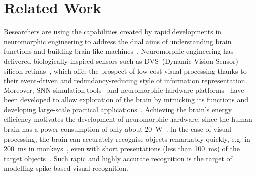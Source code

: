 \section{Related Work}
\label{sec:chapt6_relate}
Researchers are using the capabilities created by rapid developments in neuromorphic engineering to address the dual aims of understanding brain functions and building brain-like machines~\citep{furber2007neural}.
Neuromorphic engineering has delivered biologically-inspired sensors such as DVS~(Dynamic Vision Sensor) silicon retinas~\citep{serrano2013128, delbruck2008frame, yang2015dynamic, posch2014retinomorphic}, which offer the prospect of low-cost visual processing thanks to their event-driven and redundancy-reducing style of information representation.
Moreover, SNN simulation tools~\citep{davison2008pynn, gewaltig2007nest, goodman2008brian} and neuromorphic hardware platforms~\citep{furber2014spinnaker,  schemmel2010wafer,benjamin2014neurogrid,merolla2014million} have been developed to allow exploration of the brain by mimicking its functions and developing large-scale practical applications~\citep{eliasmith2012large}.
Achieving the brain's energy efficiency motivates the development of neuromorphic hardware, since the human brain has a power consumption of only about 20~W~\citep{drubach2000brain}.
In the case of visual processing, the brain can accurately recognise objects remarkably quickly, e.g. in 200~ms in monkeys~\citep{fabre1998rapid}, even with short presentations (less than 100~ms) of the target objects~\citep{keysers2001speed}.
Such rapid and highly accurate recognition is the target of modelling spike-based visual recognition.



